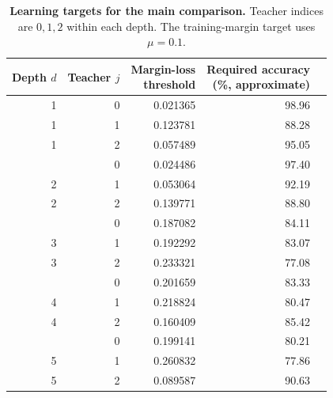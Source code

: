 \begin{table}[htbp]
    \centering
    \small
    \setlength{\tabcolsep}{8pt}
    \renewcommand{\arraystretch}{1.15}
    \begin{tabular}{rr r r r}
        \toprule
        Depth $d$ &
        Teacher $j$ &
        \shortstack{Margin-loss\\threshold} &
        \shortstack{Required accuracy\\(\%, approximate)} \\
        \midrule
        1 & 0 & 0.021365 & 98.96 \\
        1 & 1 & 0.123781 & 88.28 \\
        1 & 2 & 0.057489 & 95.05 \\
        \addlinespace[3pt]
        2 & 0 & 0.024486 & 97.40 \\
        2 & 1 & 0.053064 & 92.19 \\
        2 & 2 & 0.139771 & 88.80 \\
        \addlinespace[3pt]
        3 & 0 & 0.187082 & 84.11 \\
        3 & 1 & 0.192292 & 83.07 \\
        3 & 2 & 0.233321 & 77.08 \\
        \addlinespace[3pt]
        4 & 0 & 0.201659 & 83.33 \\
        4 & 1 & 0.218824 & 80.47 \\
        4 & 2 & 0.160409 & 85.42 \\
        \addlinespace[3pt]
        5 & 0 & 0.199141 & 80.21 \\
        5 & 1 & 0.260832 & 77.86 \\
        5 & 2 & 0.089587 & 90.63 \\
        \bottomrule
    \end{tabular}
    \caption{\textbf{Learning targets for the main comparison.}
    Teacher indices are $0,1,2$ within each depth.
    The training-margin target uses $\mu=0.1$.}
    \label{tab:numerics_learning_targets}
    \label{tab:appendix-classification-targets}
\end{table}
